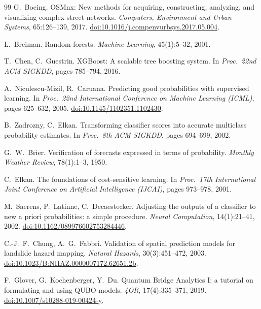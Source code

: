\documentclass[journal]{IEEEtran}
\begin{document}
\begin{thebibliography}{99}
G.~Boeing.
OSMnx: New methods for acquiring, constructing, analyzing, and visualizing
complex street networks.
\emph{Computers, Environment and Urban Systems}, 65:126--139, 2017.
\href{https://doi.org/10.1016/j.compenvurbsys.2017.05.004}{doi:10.1016/j.compenvurbsys.2017.05.004}.

L.~Breiman. Random forests. \emph{Machine Learning}, 45(1):5--32, 2001.

T.~Chen, C.~Guestrin.
XGBoost: A scalable tree boosting system.
In \emph{Proc.\ 22nd ACM SIGKDD}, pages 785--794, 2016.

A.~Niculescu-Mizil, R.~Caruana.
Predicting good probabilities with supervised learning.
In \emph{Proc.\ 22nd International Conference on Machine Learning (ICML)},
pages 625--632, 2005.
\href{https://doi.org/10.1145/1102351.1102430}{doi:10.1145/1102351.1102430}.

B.~Zadrozny, C.~Elkan.
Transforming classifier scores into accurate multiclass probability estimates.
In \emph{Proc.\ 8th ACM SIGKDD}, pages 694--699, 2002.

G.~W.~Brier.
Verification of forecasts expressed in terms of probability.
\emph{Monthly Weather Review}, 78(1):1--3, 1950.

C.~Elkan.
The foundations of cost-sensitive learning.
In \emph{Proc.\ 17th International Joint Conference on Artificial Intelligence
(IJCAI)}, pages 973--978, 2001.

M.~Saerens, P.~Latinne, C.~Decaestecker.
Adjusting the outputs of a classifier to new a priori probabilities: a simple
procedure.
\emph{Neural Computation}, 14(1):21--41, 2002.
\href{https://doi.org/10.1162/089976602753284446}{doi:10.1162/089976602753284446}.

C.-J.~F.~Chung, A.~G.~Fabbri.
Validation of spatial prediction models for landslide hazard mapping.
\emph{Natural Hazards}, 30(3):451--472, 2003.
\href{https://doi.org/10.1023/B:NHAZ.0000007172.62651.2b}{doi:10.1023/B:NHAZ.0000007172.62651.2b}.

F.~Glover, G.~Kochenberger, Y.~Du.
Quantum Bridge Analytics I: a tutorial on formulating and using QUBO models.
\emph{4OR}, 17(4):335--371, 2019.
\href{https://doi.org/10.1007/s10288-019-00424-y}{doi:10.1007/s10288-019-00424-y}.


\end{thebibliography}
\end{document}
